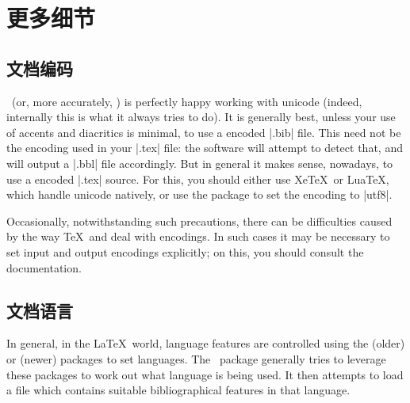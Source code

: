 \section{更多细节}

\subsection{文档编码}

\biblatex\ (or, more accurately, ) is perfectly
happy working with unicode (indeed, internally this is what it always
tries to do). It is generally best, unless your use of accents and
diacritics is minimal, to use a  encoded |.bib|
file. This need not be the encoding used in your |.tex| file: the
software will attempt to detect that, and will output a |.bbl| file
accordingly. But in general it makes sense, nowadays, to use a
 encoded |.tex| source. For this, you should either
use Xe\TeX\ or Lua\TeX, which handle unicode natively, or use the
 package to set the encoding to |utf8|.

Occasionally, notwithstanding such precautions, there can be
difficulties caused by the way \TeX\ and  deal with
encodings. In such cases it may be necessary to set input and output
encodings explicitly; on this, you should consult the 
documentation.

\subsection{文档语言}

In general, in the \LaTeX\ world, language features are controlled
using the (older)  or (newer) 
packages to set languages. The \biblatex\ package generally tries to
leverage these packages to work out what language is being used. It
then attempts to load a file which contains suitable bibliographical
features in that language.

